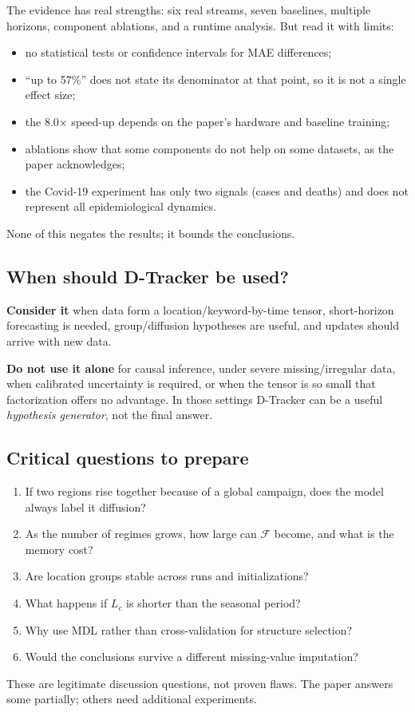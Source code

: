 The evidence has real strengths: six real streams, seven baselines, multiple horizons, component
ablations, and a runtime analysis. But read it with limits:
\begin{itemize}
  \item no statistical tests or confidence intervals for MAE differences;
  \item ``up to 57\%'' does not state its denominator at that point, so it is not a single effect size;
  \item the 8.0$\times$ speed-up depends on the paper's hardware and baseline training;
  \item ablations show that some components do not help on some datasets, as the paper acknowledges;
  \item the Covid-19 experiment has only two signals (cases and deaths) and does not represent all
        epidemiological dynamics.
\end{itemize}
None of this negates the results; it bounds the conclusions.

\subsection{When should D-Tracker be used?}

\textbf{Consider it} when data form a location/keyword-by-time tensor, short-horizon forecasting is
needed, group/diffusion hypotheses are useful, and updates should arrive with new data.

\textbf{Do not use it alone} for causal inference, under severe missing/irregular data, when calibrated
uncertainty is required, or when the tensor is so small that factorization offers no advantage. In
those settings D-Tracker can be a useful \emph{hypothesis generator}, not the final answer.

\subsection{Critical questions to prepare}

\begin{enumerate}
  \item If two regions rise together because of a global campaign, does the model always label it diffusion?
  \item As the number of regimes grows, how large can $\mathcal{F}$ become, and what is the memory cost?
  \item Are location groups stable across runs and initializations?
  \item What happens if $L_c$ is shorter than the seasonal period?
  \item Why use MDL rather than cross-validation for structure selection?
  \item Would the conclusions survive a different missing-value imputation?
\end{enumerate}
These are legitimate discussion questions, not proven flaws. The paper answers some partially; others
need additional experiments.

